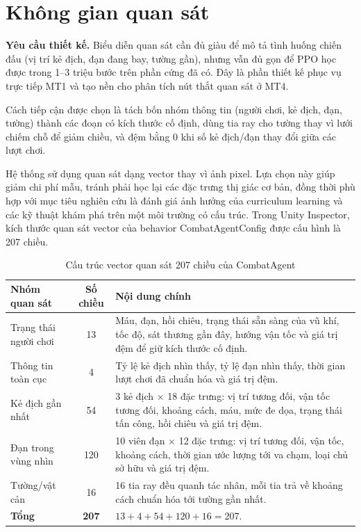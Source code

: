 \section{Không gian quan sát}

\textbf{Yêu cầu thiết kế.} Biểu diễn quan sát cần đủ giàu để mô tả tình huống chiến đấu (vị trí kẻ địch, đạn đang bay, tường gần), nhưng vẫn đủ gọn để PPO học được trong 1--3 triệu bước trên phần cứng đã có. Đây là phần thiết kế phục vụ trực tiếp MT1 và tạo nền cho phân tích nút thắt quan sát ở MT4.

Cách tiếp cận được chọn là tách bốn nhóm thông tin (người chơi, kẻ địch, đạn, tường) thành các đoạn có kích thước cố định, dùng tia ray cho tường thay vì lưới chiếm chỗ để giảm chiều, và đệm bằng 0 khi số kẻ địch/đạn thay đổi giữa các lượt chơi.

Hệ thống sử dụng quan sát dạng vector thay vì ảnh pixel. Lựa chọn này giúp giảm chi phí mẫu, tránh phải học lại các đặc trưng thị giác cơ bản, đồng thời phù hợp với mục tiêu nghiên cứu là đánh giá ảnh hưởng của curriculum learning và các kỹ thuật khám phá trên một môi trường có cấu trúc. Trong Unity Inspector, kích thước quan sát vector của behavior CombatAgentConfig được cấu hình là 207 chiều.

\begin{table}[H]
    \centering
    \small
    \caption{Cấu trúc vector quan sát 207 chiều của CombatAgent}
    \label{tab:obs_207}
    \begin{tabular}{|p{4cm}|c|p{8cm}|}
        \hline
        \textbf{Nhóm quan sát} & \textbf{Số chiều} & \textbf{Nội dung chính} \\
        \hline
        Trạng thái người chơi & 13 & Máu, đạn, hồi chiêu, trạng thái sẵn sàng của vũ khí, tốc độ, sát thương gần đây, hướng vận tốc và giá trị đệm để giữ kích thước cố định. \\
        \hline
        Thông tin toàn cục & 4 & Tỷ lệ kẻ địch nhìn thấy, tỷ lệ đạn nhìn thấy, thời gian lượt chơi đã chuẩn hóa và giá trị đệm. \\
        \hline
        Kẻ địch gần nhất & 54 & 3 kẻ địch $\times$ 18 đặc trưng: vị trí tương đối, vận tốc tương đối, khoảng cách, máu, mức đe dọa, trạng thái tấn công, hồi chiêu và giá trị đệm. \\
        \hline
        Đạn trong vùng nhìn & 120 & 10 viên đạn $\times$ 12 đặc trưng: vị trí tương đối, vận tốc, khoảng cách, thời gian ước lượng tới va chạm, loại chủ sở hữu và giá trị đệm. \\
        \hline
        Tường/vật cản & 16 & 16 tia ray đều quanh tác nhân, mỗi tia trả về khoảng cách chuẩn hóa tới tường gần nhất. \\
        \hline
        \textbf{Tổng} & \textbf{207} & $13 + 4 + 54 + 120 + 16 = 207$. \\
        \hline
    \end{tabular}
\end{table}

